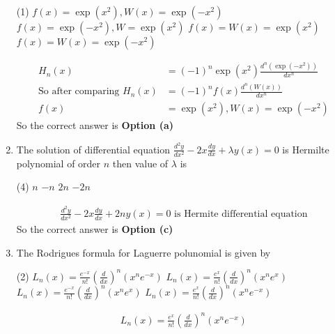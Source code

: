 \begin{enumerate}[label=\color{ocre}\textbf{\arabic*.}]
 \begin{tasks}(1)
	\task[\textbf{a.}]$f(x)=\exp \left(x^{2}\right), W(x)=\exp \left(-x^{2}\right)$
	\task[\textbf{b.}]$f(x)=\exp \left(-x^{2}\right), W=\exp \left(x^{2}\right)$
	\task[\textbf{c.}] $f(x)=W(x)=\exp \left(x^{2}\right)$
	\task[\textbf{d.}] $f(x)=W(x)=\exp \left(-x^{2}\right)$
\end{tasks}
\begin{answer}
	\begin{align*}
	H_{n}(x)&=(-1)^{n} \exp \left(x^{2}\right) \frac{d^{n}\left(\exp \left(-x^{2}\right)\right)}{d x^{n}}\\
	\text{So after comparing }H_{n}(x)&=(-1)^{n} f(x) \frac{d^{n}(W(x))}{d x^{n}}\\
	f(x)&=\exp \left(x^{2}\right), W(x)=\exp \left(-x^{2}\right)
	\end{align*}
		So the correct answer is \textbf{Option (a)}
\end{answer}
\item The solution of differential equation $\frac{d^{2} y}{d x^{2}}-2 x \frac{d y}{d x}+\lambda y(x)=0$ is Hermilte polynomial of order $n$ then value of $\lambda$ is
 \begin{tasks}(4)
	\task[\textbf{a.}]$n$
	\task[\textbf{b.}] $-n$
	\task[\textbf{c.}]$2 n$
	\task[\textbf{d.}] $-2 n$
\end{tasks}
\begin{answer}
	\begin{align*}
	\frac{d^{2} y}{d x^{2}}-2 x \frac{d y}{d x}+2 n y(x)=0\text{ is Hermite differential equation}
	\end{align*}
		So the correct answer is \textbf{Option (c)}
\end{answer}
\item The Rodrigues formula for Laguerre polunomial is given by
 \begin{tasks}(2)
	\task[\textbf{a.}]$L_n(x)=\frac{e^{-x}}{n !}\left(\frac{d}{d x}\right)^{n}\left(x^{n} e^{-x}\right)$
	\task[\textbf{b.}]$L_{n}(x)=\frac{e^{x}}{n !}\left(\frac{d}{d x}\right)^{n}\left(x^{n} e^{x}\right)$
	\task[\textbf{c.}]$L_n(x)=\frac{e^{-x}}{n !}\left(\frac{d}{d x}\right)^{n}\left(x^{n} e^{x}\right)$
	\task[\textbf{d.}] $L_{n}(x)=\frac{e^{x}}{n !}\left(\frac{d}{d x}\right)^{n}\left(x^{n} e^{-x}\right)$
\end{tasks}
\begin{answer}
	\begin{align*}
	L_{n}(x)=\frac{e^{x}}{n !}\left(\frac{d}{d x}\right)^{n}\left(x^{n} e^{-x}\right)
	\end{align*}

\end{answer}
\end{enumerate}
